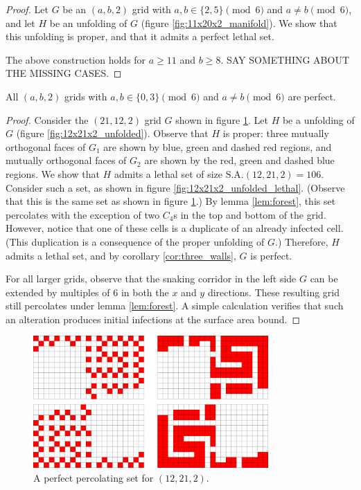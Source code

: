 \begin{proof}
Let $G$ be an $(a,b,2)$ grid with $a,b \in \{2,5\} \pmod 6$ and $a \neq b \pmod 6$, and let $H$ be an unfolding of $G$ (figure \ref{fig:11x20x2_manifold}). We show that this unfolding is proper, and that it admits a perfect lethal set. 

The above construction holds for $a \geq 11$ and $b \geq 8$. SAY SOMETHING ABOUT THE MISSING CASES.
\end{proof}


\begin{con}
All $(a,b,2)$ grids with $a,b \in \{0,3\} \pmod 6$ and $a \neq b \pmod 6$ are perfect. 
\end{con}

\begin{proof}
Consider the $(21,12,2)$ grid $G$ shown in figure \ref{fig:12x21x2}. Let $H$ be a unfolding of $G$ (figure \ref{fig:12x21x2_unfolded}). Observe that $H$ is proper: three mutually orthogonal faces of $G_1$ are shown by blue, green and dashed red regions, and mutually orthogonal faces of $G_2$ are shown by the red, green and dashed blue regions. We show that $H$ admits a lethal set of size $\text{S.A.}(12,21,2) = 106$. Consider such a set, as shown in figure \ref{fig:12x21x2_unfolded_lethal}. (Observe that this is the same set as shown in figure \ref{fig:12x21x2}.) By lemma \ref{lem:forest}, this set percolates with the exception of two $C_4$s in the top and bottom of the grid. However, notice that one of these cells is a duplicate of an already infected cell. (This duplication is a consequence of the proper unfolding of $G$.) Therefore, $H$ admits a lethal set, and by corollary \ref{cor:three_walls}, $G$ is perfect.

For all larger grids, observe that the snaking corridor in the left side $G$ can be extended by multiples of 6 in both the $x$ and $y$ directions. These resulting grid still percolates under lemma \ref{lem:forest}. A simple calculation verifies that such an alteration produces initial infections at the surface area bound. 
\end{proof}

\begin{figure}[]
\centering
\includegraphics[width=0.8\textwidth]{figures/4/12x21x2.pdf}
\caption{A perfect percolating set for $(12,21,2)$.}
\label{fig:12x21x2}
\end{figure} 

